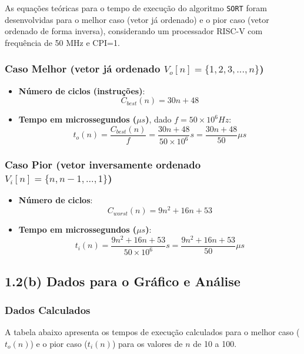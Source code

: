 \documentclass[12pt,a4paper]{article}
\begin{document}
As equações teóricas para o tempo de execução do algoritmo \texttt{SORT} foram desenvolvidas para o melhor caso (vetor já ordenado) e o pior caso (vetor ordenado de forma inversa), considerando um processador RISC-V com frequência de 50 MHz e CPI=1.

\subsubsection*{Caso Melhor (vetor já ordenado $V_{o}[n]=\{1,2,3,...,n\}$)}
\begin{itemize}
    \item \textbf{Número de ciclos (instruções)}:
    $$ C_{best}(n) = 30n + 48 $$
    \item \textbf{Tempo em microssegundos ($\mu s$)}, dado $f=50 \times 10^{6} Hz$:
    $$ t_{o}(n) = \frac{C_{best}(n)}{f} = \frac{30n + 48}{50 \times 10^{6}}s = \frac{30n + 48}{50}\mu s $$
\end{itemize}

\subsubsection*{Caso Pior (vetor inversamente ordenado $V_{i}[n]=\{n,n-1,...,1\}$)}
\begin{itemize}
    \item \textbf{Número de ciclos}:
    $$ C_{worst}(n) = 9n^{2} + 16n + 53 $$
    \item \textbf{Tempo em microssegundos ($\mu s$)}:
    $$ t_{i}(n) = \frac{9n^{2} + 16n + 53}{50 \times 10^{6}}s = \frac{9n^{2} + 16n + 53}{50}\mu s $$
\end{itemize}

\subsection*{1.2(b) Dados para o Gráfico e Análise}

\subsubsection*{Dados Calculados}
A tabela abaixo apresenta os tempos de execução calculados para o melhor caso ($t_o(n)$) e o pior caso ($t_i(n)$) para os valores de $n$ de 10 a 100.
\end{document}
